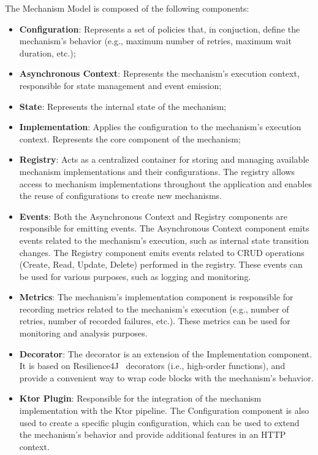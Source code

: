 The Mechanism Model is composed of the following components:
\begin{itemize}
    \item \textbf{Configuration}: Represents a set of policies that, in conjuction, define the mechanism's behavior (e.g., maximum number of retries, maximum wait duration, etc.);
    \item \textbf{Asynchronous Context}: Represents the mechanism's execution context, responsible for state management and event emission;
    \item \textbf{State}: Represents the internal state of the mechanism;
    \item \textbf{Implementation}: Applies the configuration to the mechanism's execution context.
    Represents the core component of the mechanism;
    \item \textbf{Registry}: Acts as a centralized container for storing and managing available mechanism implementations and their configurations.
    The registry allows access to mechanism implementations throughout the application and enables the reuse of configurations to create new mechanisms.
    \item \textbf{Events}: Both the Asynchronous Context and Registry components are responsible for emitting events.
    The Asynchronous Context component emits events related to the mechanism's execution, such as internal state transition changes.
    The Registry component emits events related to CRUD operations (Create, Read, Update, Delete) performed in the registry.
    These events can be used for various purposes, such as logging and monitoring.
    \item \textbf{Metrics}: The mechanism's implementation component is responsible for recording metrics related to the mechanism's execution (e.g., number of retries, number of recorded failures, etc.).
    These metrics can be used for monitoring and analysis purposes.
    \item \textbf{Decorator}: The decorator is an extension of the Implementation component.
    It is based on Resilience4J~\cite{resilience4j} decorators (i.e., high-order functions), and provide a convenient way to wrap code blocks with the mechanism's behavior.
    \item \textbf{Ktor Plugin}: Responsible for the integration of the mechanism implementation with the Ktor pipeline.
    The Configuration component is also used to create a specific plugin configuration,
    which can be used to extend the mechanism's behavior and provide additional features in an HTTP context.
\end{itemize}


